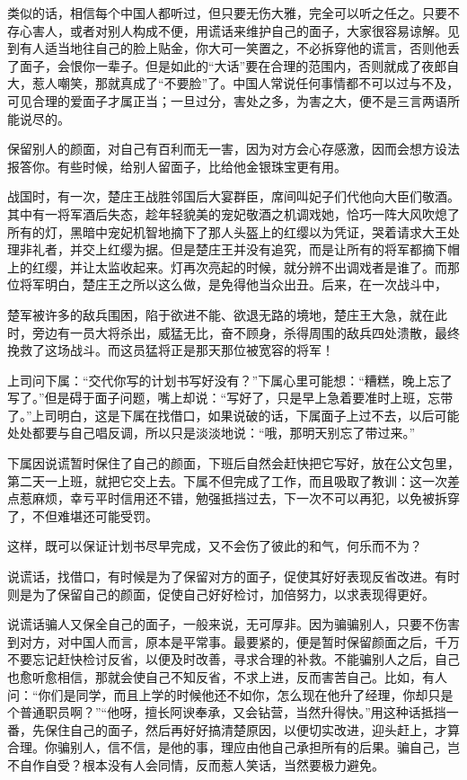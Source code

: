 \documentclass[fontset=fandol, a4paper, 12pt, openright]{ctexbook}
\begin{document}
类似的话，相信每个中国人都听过，但只要无伤大雅，完全可以听之任之。只要不存心害人，或者对别人构成不便，用谎话来维护自己的面子，大家很容易谅解。见到有人适当地往自己的脸上贴金，你大可一笑置之，不必拆穿他的谎言，否则他丢了面子，会恨你一辈子。但是如此的“大话”要在合理的范围内，否则就成了夜郎自大，惹人嘲笑，那就真成了“不要脸”了。中国人常说任何事情都不可以过与不及，可见合理的爱面子才属正当；一旦过分，害处之多，为害之大，便不是三言两语所能说尽的。

保留别人的颜面，对自己有百利而无一害，因为对方会心存感激，因而会想方设法报答你。有些时候，给别人留面子，比给他金银珠宝更有用。

战国时，有一次，楚庄王战胜邻国后大宴群臣，席间叫妃子们代他向大臣们敬酒。其中有一将军酒后失态，趁年轻貌美的宠妃敬酒之机调戏她，恰巧一阵大风吹熄了所有的灯，黑暗中宠妃机智地摘下了那人头盔上的红缨以为凭证，哭着请求大王处理非礼者，并交上红缨为据。但是楚庄王并没有追究，而是让所有的将军都摘下帽上的红缨，并让太监收起来。灯再次亮起的时候，就分辨不出调戏者是谁了。而那位将军明白，楚庄王之所以这么做，是免得他当众出丑。后来，在一次战斗中，

楚军被许多的敌兵围困，陷于欲进不能、欲退无路的境地，楚庄王大急，就在此时，旁边有一员大将杀出，威猛无比，奋不顾身，杀得周围的敌兵四处溃散，最终挽救了这场战斗。而这员猛将正是那天那位被宽容的将军！

上司问下属：“交代你写的计划书写好没有？”下属心里可能想：“糟糕，晚上忘了写了。”但是碍于面子问题，嘴上却说：“写好了，只是早上急着要准时上班，忘带了。”上司明白，这是下属在找借口，如果说破的话，下属面子上过不去，以后可能处处都要与自己唱反调，所以只是淡淡地说：“哦，那明天别忘了带过来。”

下属因说谎暂时保住了自己的颜面，下班后自然会赶快把它写好，放在公文包里，第二天一上班，就把它交上去。下属不但完成了工作，而且吸取了教训：这一次差点惹麻烦，幸亏平时信用还不错，勉强抵挡过去，下一次不可以再犯，以免被拆穿了，不但难堪还可能受罚。

这样，既可以保证计划书尽早完成，又不会伤了彼此的和气，何乐而不为？

说谎话，找借口，有时候是为了保留对方的面子，促使其好好表现反省改进。有时则是为了保留自己的颜面，促使自己好好检讨，加倍努力，以求表现得更好。

说谎话骗人又保全自己的面子，一般来说，无可厚非。因为骗骗别人，只要不伤害到对方，对中国人而言，原本是平常事。最要紧的，便是暂时保留颜面之后，千万不要忘记赶快检讨反省，以便及时改善，寻求合理的补救。不能骗别人之后，自己也愈听愈相信，那就会使自己不知反省，不求上进，反而害苦自己。比如，有人问：“你们是同学，而且上学的时候他还不如你，怎么现在他升了经理，你却只是个普通职员啊？”“他呀，擅长阿谀奉承，又会钻营，当然升得快。”用这种话抵挡一番，先保住自己的面子，然后再好好搞清楚原因，以便切实改进，迎头赶上，才算合理。你骗别人，信不信，是他的事，理应由他自己承担所有的后果。骗自己，岂不自作自受？根本没有人会同情，反而惹人笑话，当然要极力避免。
\end{document}
